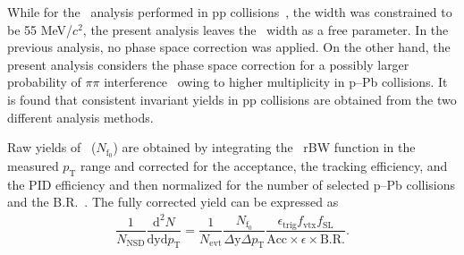 While for the \fzero~analysis performed in pp collisions~\cite{ALICE:2022qnb}, the width was constrained to be 55 MeV/$c^{2}$, the present analysis leaves the \fzero~width as a free parameter. In the previous analysis, no phase space correction was applied. On the other hand, the present analysis considers the phase space correction for a possibly larger probability of $\pi\pi$ interference~\cite{STAR:2003vqj} owing to higher multiplicity in p--Pb collisions. It is found that consistent invariant yields in pp collisions are obtained from the two different analysis methods.

Raw yields of \fzero~($N_{\mathrm{f}_{0}}$) are obtained by integrating the \fzero~rBW function in the measured $p_{\mathrm{T}}$ range and corrected for the acceptance, the tracking efficiency, and the PID efficiency and then normalized for the number of selected p--Pb collisions and the B.R.~\cite{Stone:2013eaa}. The fully corrected yield can be expressed as
\begin{eqnarray}
\dfrac{1}{N_{\mathrm{NSD}}}\dfrac{\mathrm{d}^{2}N}{\mathrm{dyd}p_{\mathrm{T}}} = \dfrac{1}{N_{\mathrm{evt}}} \dfrac{ N_{\mathrm{f}_{0}} }{ \Delta \mathrm{y} \Delta p_{\mathrm{T}} } \dfrac{  \epsilon_{\mathrm{trig}} f_{\mathrm{vtx}} f_{\mathrm{SL}} }{\mathrm{Acc} \times \epsilon \times \mathrm{B.R.} }.
\end{eqnarray}
